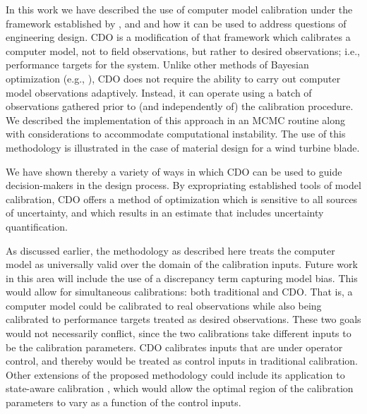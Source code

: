 \documentclass{article}
\begin{document}
In this work we have described the 
use of computer model calibration under the framework established by \cite{Kennedy2001}, \cite{Williams2006} and \cite{Bayarri2007} and how it can be used to address questions of engineering design. 
%
CDO is a modification of that framework which calibrates a computer model, not to field observations, but rather to desired observations; i.e., performance targets for the system. 
%
Unlike other methods of Bayesian optimization (e.g., \citealt{Shahriari2016}), CDO does not require the ability to carry out computer model observations adaptively.
%
Instead, it can operate using a batch of observations gathered prior to (and independently of) the calibration procedure.
%
We described the implementation of this approach in an MCMC routine along with considerations to accommodate computational instability.
%
The use of this methodology is illustrated in the case of material design for a wind turbine blade. 

We have shown thereby a variety of ways in which CDO can be used to guide decision-makers in the design process. 
%
By expropriating established tools of model calibration, CDO offers a method of optimization which is sensitive to all sources of uncertainty, and which results in an estimate that includes uncertainty quantification.

As discussed earlier, the methodology as described here treats the computer model as universally valid over the domain of the calibration inputs. 
%
Future work in this area will include the use of a discrepancy term capturing model bias.
%
This would allow for simultaneous calibrations: both traditional and CDO.
%
That is, a computer model could be calibrated to real observations while also being calibrated to performance targets treated as desired observations.
%
These two goals would not necessarily conflict, since the two calibrations take different inputs to be the calibration parameters.
% 
CDO calibrates inputs that are under operator control, and thereby would be treated as control inputs in traditional calibration.
%
Other extensions of the proposed methodology could include its application to state-aware calibration \citep{Atamturktur2015,Stevens2018,Brown2016}, which would allow the optimal region of the calibration parameters to vary as a function of the control inputs.





\pagebreak


\end{document}
